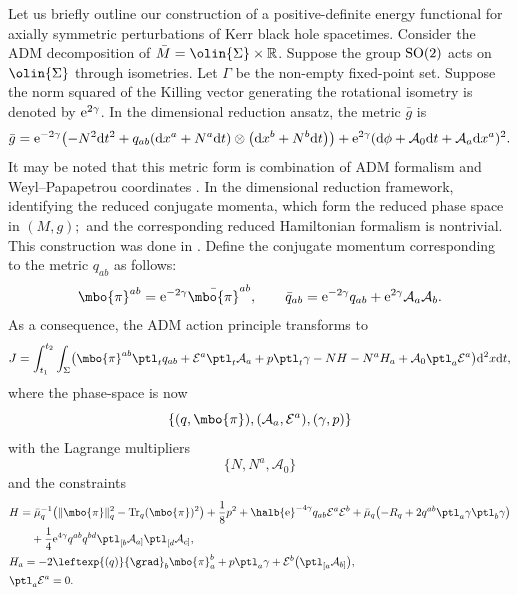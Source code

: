 Let us briefly outline our construction of a positive-definite energy functional for axially symmetric perturbations of Kerr black hole spacetimes. Consider the ADM decomposition of $\bar{M}=\olin{\Sigma} \times \mathbb{R}$. Suppose the group ${\rm SO}(2)$ acts on $\olin{\Sigma}$ through isometries. Let $\Gamma$ be the non-empty fixed-point set. Suppose the norm squared of the Killing vector generating the rotational isometry is denoted by ${\rm e}^{2\gamma}$. In the dimensional reduction ansatz, the metric $\bar{g}$ is
\begin{align}\label{KK-ADM}
\bar{g} = {\rm e}^{-2\gamma} \bigl(-N^2 {\rm d}t^2 + q_{ab} ({\rm d}x^a + N^a {\rm d}t) \otimes \bigl({\rm d}x^b + N^b {\rm d}t\bigr)\bigr) + {\rm e}^{2\gamma} ({\rm d}\phi + \mathcal{A}_0 {\rm d}t + \mathcal{A}_a {\rm d}x^a)^2.
\end{align}
It may be noted that this metric form is combination of ADM formalism and Weyl--Papapetrou coordinates \cite{Moncrief_74}.
In the dimensional reduction framework, identifying the reduced conjugate momenta, which form the reduced phase space in $(M, g);$ and the corresponding reduced Hamiltonian formalism is nontrivial. This construction was done in \cite{kaluz1}. Define the conjugate momentum corresponding to the metric $q_{ab}$ as follows:
\begin{align*}
\mbo{\pi}^{ab} = {\rm e}^{-2\gamma} \bar{\mbo{\pi}}^{ab}, \qquad \bar{q}_{ab} = {\rm e}^{-2\gamma} q_{ab} + {\rm e}^{2\gamma} \mathcal{A}_a \mathcal{A}_b.
\end{align*}
As a consequence, the ADM action principle transforms to
\begin{align*}
J = \int^{t_2}_{t_1}\int_{\Sigma} \bigl(\mbo{\pi}^{ab} \ptl_t q_{ab} + \mathcal{E}^a \ptl_t \mathcal{A}_a + p \ptl_t \gamma - N H - N^aH_a+ \mathcal{A}_0 \ptl_a \mathcal{E}^a \bigr) {\rm d}^2x{\rm d}t,
\end{align*}
where the phase-space is now
\[
 \{ (q, \mbo{\pi}), (\mathcal{A}_a, \mathcal{E}^a), (\gamma, p) \}
\]
with the Lagrange multipliers
\[
 \{ N, N^a, \mathcal{A}_0 \}
\]
and the constraints
\begin{subequations} \label{2+1constraints}
\begin{align}
&H= \bar{\mu}^{-1}_q \bigl(\Vert \mbo{\pi} \Vert^2_q - {\rm Tr}_q(\mbo{\pi})^2\bigr) + \frac{1}{8} p^2 + \halb {\rm e}^{-4\gamma}
q_{ab} \mathcal{E}^a \mathcal{E}^b + \bar{\mu}_q \bigl(-R_q + 2 q^{ab} \ptl_a \gamma \ptl_b \gamma\bigr) \notag\\
&\hphantom{H=}{}+ \frac{1}{4} {\rm e}^{4\gamma} q^{ab}q^{bd} \ptl_{[b} \mathcal{A}_{a]} \ptl_{[d} \mathcal{A}_{c]}, \\
&H_a= -2 \leftexp{(q)}{ \grad}_b \mbo{\pi}^b_a + p \ptl_a \gamma + \mathcal{E}^b \bigl(\ptl_{[a}\mathcal{A}_{b]} \bigr),\\
&\ptl_a \mathcal{E}^a =0.
\end{align}
\end{subequations}
